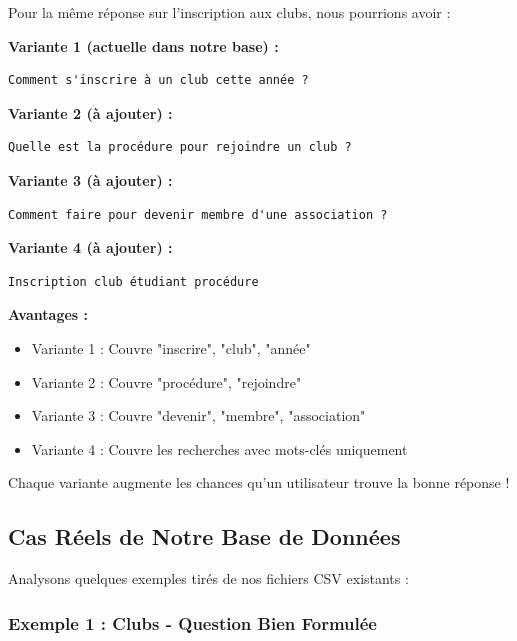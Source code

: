 \documentclass[11pt,a4paper]{article}
\begin{document}
\begin{exemple}

Pour la même réponse sur l'inscription aux clubs, nous pourrions avoir :

\vspace{0.3cm}
\textbf{Variante 1 (actuelle dans notre base) :}
\begin{lstlisting}
Comment s'inscrire à un club cette année ?
\end{lstlisting}

\textbf{Variante 2 (à ajouter) :}
\begin{lstlisting}
Quelle est la procédure pour rejoindre un club ?
\end{lstlisting}

\textbf{Variante 3 (à ajouter) :}
\begin{lstlisting}
Comment faire pour devenir membre d'une association ?
\end{lstlisting}

\textbf{Variante 4 (à ajouter) :}
\begin{lstlisting}
Inscription club étudiant procédure
\end{lstlisting}

\vspace{0.3cm}
\textbf{Avantages :}
\begin{itemize}
    \item Variante 1 : Couvre "inscrire", "club", "année"
    \item Variante 2 : Couvre "procédure", "rejoindre"
    \item Variante 3 : Couvre "devenir", "membre", "association"
    \item Variante 4 : Couvre les recherches avec mots-clés uniquement
\end{itemize}

Chaque variante augmente les chances qu'un utilisateur trouve la bonne réponse !
\end{exemple}

\subsection{Cas Réels de Notre Base de Données}

Analysons quelques exemples tirés de nos fichiers CSV existants :

\subsubsection{Exemple 1 : Clubs - Question Bien Formulée}
\end{document}
